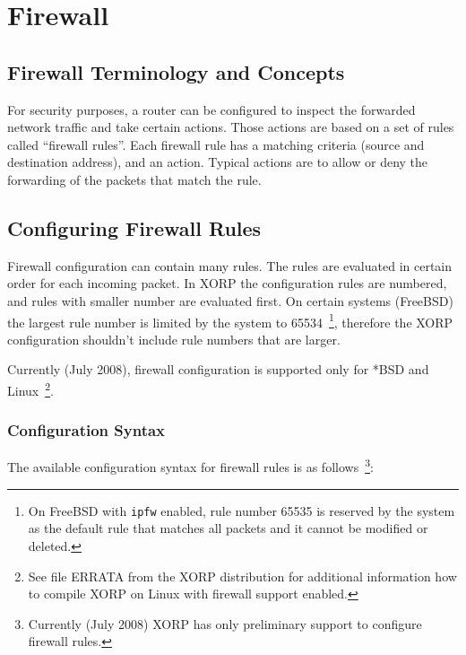%
%

\chapter{Firewall}
\label{firewall}
\section{Firewall Terminology and Concepts}

For security purposes, a router can be configured to inspect the
forwarded network traffic and take certain actions. Those actions are
based on a set of rules called ``firewall rules''. Each firewall rule
has a matching criteria (\eg source and destination address), and an
action. Typical actions are to allow or deny the forwarding of the
packets that match the rule.



\newpage
\section{Configuring Firewall Rules}

Firewall configuration can contain many rules.
The rules are evaluated in certain order for each incoming packet.
In XORP the configuration rules are numbered, and rules with smaller
number are evaluated first. On certain systems (\eg FreeBSD) the largest
rule number is limited by the system to 65534~\footnote{On FreeBSD with
{\tt ipfw} enabled, rule number 65535 is reserved by the system as the
default rule that matches all packets and it cannot be modified or
deleted.}, therefore the XORP  configuration shouldn't include rule
numbers that are larger.

Currently (July 2008), firewall configuration is supported only for
*BSD and Linux~\footnote{See file ERRATA from the XORP distribution for
additional information how to compile XORP on Linux with firewall
support enabled.}.

\subsection{Configuration Syntax}

The available configuration syntax for firewall rules is as
follows~\footnote{Currently (July 2008) XORP has only preliminary support to
  configure firewall rules.}: 

